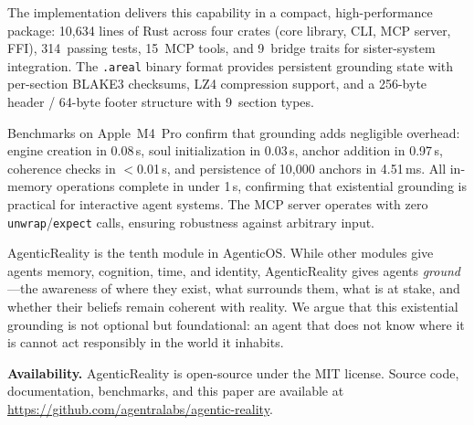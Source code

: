 \documentclass[10pt, twocolumn]{article}
\begin{document}
The implementation delivers this capability in a compact, high-performance package: 10{,}634 lines of Rust across four crates (core library, CLI, MCP server, FFI), 314~passing tests, 15~MCP tools, and 9~bridge traits for sister-system integration. The \texttt{.areal} binary format provides persistent grounding state with per-section BLAKE3 checksums, LZ4 compression support, and a 256-byte header / 64-byte footer structure with 9~section types.

Benchmarks on Apple~M4~Pro confirm that grounding adds negligible overhead: engine creation in 0.08\,\textmu{}s, soul initialization in 0.03\,\textmu{}s, anchor addition in 0.97\,\textmu{}s, coherence checks in $<$0.01\,\textmu{}s, and persistence of 10{,}000 anchors in 4.51\,ms. All in-memory operations complete in under 1\,\textmu{}s, confirming that existential grounding is practical for interactive agent systems. The MCP server operates with zero \texttt{unwrap}/\texttt{expect} calls, ensuring robustness against arbitrary input.

AgenticReality is the tenth module in AgenticOS. While other modules give agents memory, cognition, time, and identity, AgenticReality gives agents \emph{ground}---the awareness of where they exist, what surrounds them, what is at stake, and whether their beliefs remain coherent with reality. We argue that this existential grounding is not optional but foundational: an agent that does not know where it is cannot act responsibly in the world it inhabits.

\textbf{Availability.} AgenticReality is open-source under the MIT license. Source code, documentation, benchmarks, and this paper are available at \url{https://github.com/agentralabs/agentic-reality}.



\end{document}
